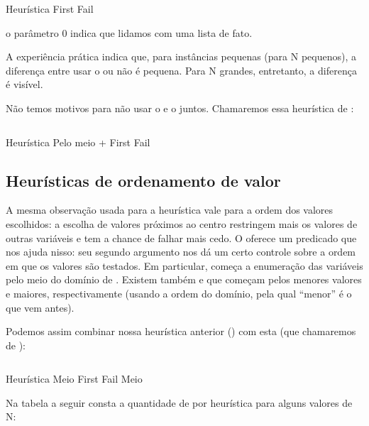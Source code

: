 \documentclass{article}
\begin{document}
    \begin{listing}
    \inputminted{prolog}{../Exemplos/Cap11/prog4_queensHeurFrstFail.ecl}
    \caption{Heurística First Fail}
    \end{listing}

\indent o parâmetro 0 indica que lidamos com uma lista de fato.

A experiência prática indica que, para instâncias pequenas (para N pequenos), a diferença entre usar
o  ou não é pequena. Para N grandes, entretanto, a diferença é visível.

Não temos motivos  para não usar o  e o
 juntos. Chamaremos essa heurística de :

    \begin{listing}
    \inputminted{prolog}{../Exemplos/Cap11/prog5_queensHeurMoff.ecl}
    \caption{Heurística Pelo meio + First Fail}
    \end{listing}

\subsection{Heurísticas de ordenamento de valor}

A mesma observação usada para a heurística  vale para a ordem dos valores
escolhidos: a escolha de valores próximos ao centro restringem mais os valores de outras variáveis e
tem a chance de falhar mais cedo. O \eclipse oferece um predicado  que nos ajuda
nisso: seu segundo argumento nos dá um certo controle sobre a ordem em que os valores são testados.
Em particular,  começa a enumeração das variáveis pelo meio do domínio
de . Existem também  e  que começam
pelos menores valores e maiores, respectivamente (usando a ordem do domínio, pela qual ``menor'' é o
que vem antes).

Podemos assim combinar nossa heurística anterior () com esta (que chamaremos de
):

    \begin{listing}
    \inputminted{prolog}{../Exemplos/Cap11/prog6_queensHeurMoffMo.ecl}
    \caption{Heurística Meio First Fail Meio}
    \end{listing}

Na tabela a seguir consta a quantidade de  por heurística para alguns
valores de N:
\end{document}
